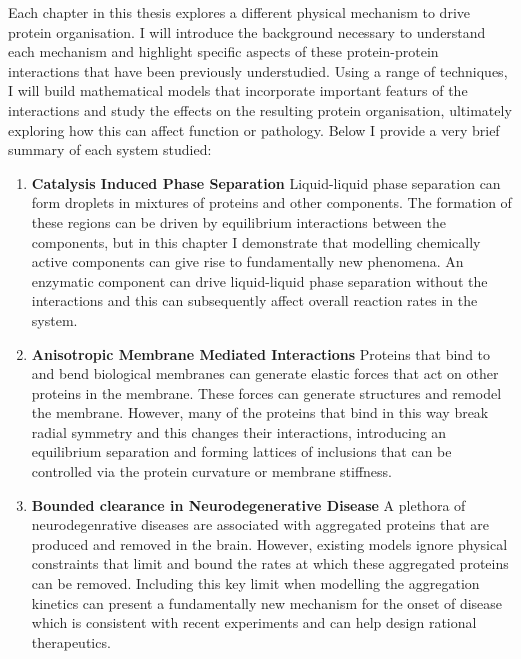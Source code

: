 Each chapter in this thesis explores a different physical mechanism to drive protein organisation. I will introduce the background necessary to understand each mechanism and highlight specific aspects of these protein-protein interactions that have been previously understudied. Using a range of techniques, I will build mathematical models that incorporate important featurs of the interactions and study the effects on the resulting protein organisation, ultimately exploring how this can affect function or pathology. Below I provide a very brief summary of each system studied:
\begin{enumerate}
    \item \textbf{Catalysis Induced Phase Separation} Liquid-liquid phase separation can form droplets in mixtures of proteins and other components. The formation of these regions can be driven by equilibrium interactions between the components, but in this chapter I demonstrate that modelling chemically active components can give rise to fundamentally new phenomena. An enzymatic component can drive liquid-liquid phase separation without the interactions and this can subsequently affect overall reaction rates in the system.
    \item \textbf{Anisotropic Membrane Mediated Interactions} Proteins that bind to and bend biological membranes can generate elastic forces that act on other proteins in the membrane. These forces can generate structures and remodel the membrane. However, many of the proteins that bind in this way break radial symmetry and this changes their interactions, introducing an equilibrium separation and forming lattices of inclusions that can be controlled via the protein curvature or membrane stiffness.
    \item \textbf{Bounded clearance in Neurodegenerative Disease} A plethora of neurodegenrative diseases are associated with aggregated proteins that are produced and removed in the brain. However, existing models ignore physical constraints that limit and bound the rates at which these aggregated proteins can be removed. Including this key limit when modelling the aggregation kinetics can present a fundamentally new mechanism for the onset of disease which is consistent with recent experiments and can help design rational therapeutics.
\end{enumerate}